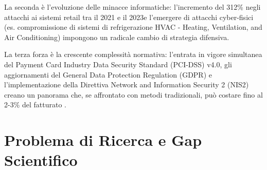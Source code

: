La seconda è l'evoluzione delle minacce informatiche: l'incremento del 312\% negli attacchi ai sistemi retail tra il 2021 e il 2023\autocite{enisa2024retail}e l'emergere di attacchi cyber-fisici (es. compromissione di sistemi di refrigerazione HVAC - Heating, Ventilation, and Air Conditioning) impongono un radicale cambio di strategia difensiva. 

La terza forza è la crescente complessità normativa: l'entrata in vigore simultanea del Payment Card Industry Data Security Standard (PCI-DSS) v4.0, gli aggiornamenti del General Data Protection Regulation (GDPR) e l'implementazione della Direttiva Network and Information Security 2 (NIS2) creano un panorama che, se affrontato con metodi tradizionali, può costare fino al 2-3\% del fatturato \autocite{ponemon2024compliance}.

\section{Problema di Ricerca e Gap Scientifico}

